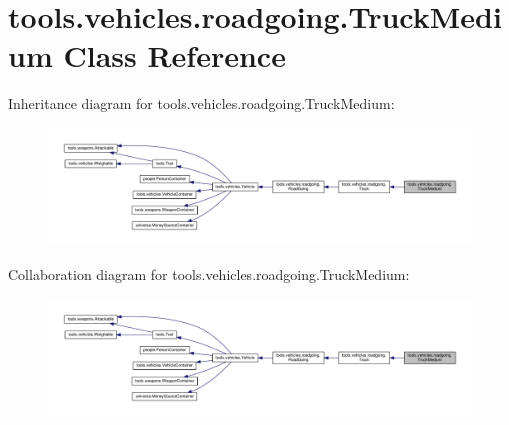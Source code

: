 \hypertarget{classtools_1_1vehicles_1_1roadgoing_1_1_truck_medium}{}\section{tools.\+vehicles.\+roadgoing.\+Truck\+Medium Class Reference}
\label{classtools_1_1vehicles_1_1roadgoing_1_1_truck_medium}


Inheritance diagram for tools.\+vehicles.\+roadgoing.\+Truck\+Medium\+:
\nopagebreak
\begin{figure}[H]
\begin{center}
\leavevmode
\includegraphics[width=350pt]{classtools_1_1vehicles_1_1roadgoing_1_1_truck_medium__inherit__graph}
\end{center}
\end{figure}


Collaboration diagram for tools.\+vehicles.\+roadgoing.\+Truck\+Medium\+:
\nopagebreak
\begin{figure}[H]
\begin{center}
\leavevmode
\includegraphics[width=350pt]{classtools_1_1vehicles_1_1roadgoing_1_1_truck_medium__coll__graph}
\end{center}
\end{figure}
